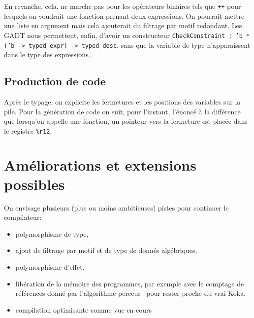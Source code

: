 \documentclass[11pt]{article}
\begin{document}
En revanche, cela, ne marche pas pour les opérateurs binaires tels que
\texttt{++} pour lesquels on voudrait une fonction prenant deux expressions. On
pourrait mettre une liste en argument mais cela ajouterait du filtrage par motif
redondant. Les GADT nous permettent, enfin, d'avoir un constructeur
\texttt{\texttt{CheckConstraint : 'b * ('b -> typed\_expr) -> typed\_desc}},
sans que la variable de type n'apparaîssent dans le type des expressions.

\subsection{Production de code}
Après le typage, on explicite les fermetures et les positions des variables sur
la pile. Pour la génération de code on suit, pour l'instant, l'énoncé à la
différence que lorsqu'on appelle une fonction, un pointeur vers la fermeture est
placée dans le registre \texttt{\%r12}.

\section{Améliorations et extensions possibles}
On envisage plusieurs (plus ou moins ambitieuses) pistes pour continuer le
compilateur:
\begin{itemize}
  \item polymorphisme de type,
  \item ajout de filtrage par motif et de type de donnés algébriques,
  \item polymorphisme d'effet,
  \item libération de la mémoire des programmes, par exemple avec le comptage de
    références donné par l'algorithme perceus~\cite{reinking2021perceus} pour
    rester proche du vrai Koka,
  \item compilation optimisante comme vue en cours
\end{itemize}
\printbibliography
\end{document}
